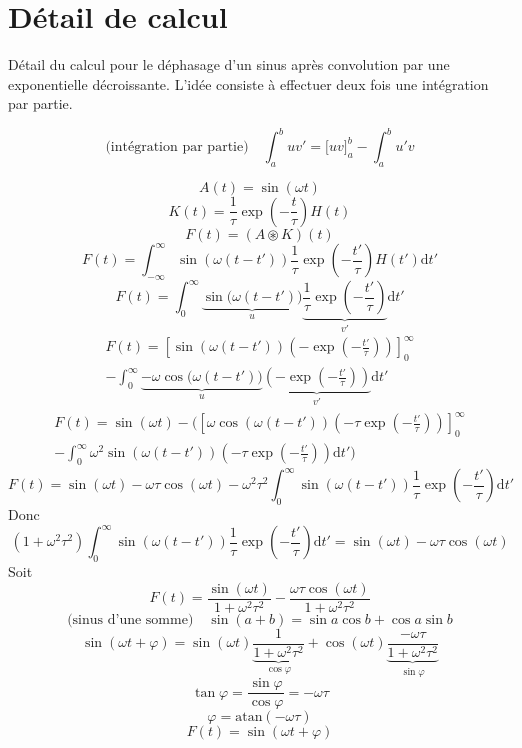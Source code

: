 




\chapter{Détail de calcul}\label{calculdetail}

Détail du calcul pour le déphasage d'un sinus après convolution par une exponentielle décroissante. L'idée consiste à effectuer deux fois une intégration par partie.

$$
\text{(intégration par partie)} \quad \int_a^buv' = \Big[uv\Big]_a^b - \int_a^b u'v
$$

$$ A(t) = \sin(\omega t) $$
$$ K(t) = \frac{1}{\tau}\exp\left(-\frac{t}{\tau}\right)H(t) $$
$$ F(t) = (A\circledast K)(t) $$ 
$$
F(t) = \int_{-\infty}^\infty\sin(\omega(t-t'))\frac{1}{\tau}\exp\left(-\frac{t'}{\tau}\right)H(t')\mathrm{d}t'
$$
$$
F(t) = \int_{0}^\infty\underbrace{\sin\bigg(\omega(t-t')\bigg)}_u\underbrace{\frac{1}{\tau}\exp\left(-\frac{t'}{\tau}\right)}_{v'}\mathrm{d}t'
$$
\begin{multline}
F(t) = \left[\sin(\omega(t-t'))\left(-\exp\left(-\frac{t'}{\tau}\right)\right)\right]_0^\infty \\ -
\int_{0}^\infty\underbrace{-\omega\cos\bigg(\omega(t-t')\bigg)}_u\underbrace{\left(-\exp\left(-\frac{t'}{\tau}\right)\right)}_{v'}\mathrm{d}t'
\end{multline}
\begin{multline}
F(t) = \sin(\omega t) -
\Bigg(\left[\omega\cos(\omega(t-t'))\left(-\tau\exp\left(-\frac{t'}{\tau}\right)\right)\right]_0^\infty \\ -
\int_0^\infty\omega^2\sin(\omega(t-t'))\left(-\tau\exp\left(-\frac{t'}{\tau}\right)\right)\mathrm{d}t' \Bigg)
\end{multline}
$$
F(t) = \sin(\omega t) - \omega\tau\cos(\omega t) - \omega^2\tau^2\int_0^\infty\sin(\omega(t-t')) \frac{1}{\tau}\exp\left(-\frac{t'}{\tau}\right)\mathrm{d}t'
$$
Donc
$$
(1+\omega^2\tau^2)\int_0^\infty\sin(\omega(t-t')) \frac{1}{\tau}\exp\left(-\frac{t'}{\tau}\right)\mathrm{d}t' = \sin(\omega t) - \omega\tau\cos(\omega t)
$$
Soit
$$
F(t) = \frac{\sin(\omega t)}{1+\omega^2\tau^2} - \frac{\omega\tau\cos(\omega t)}{1+\omega^2\tau^2}
$$
$$ \text{(sinus d'une somme)}  \quad  \sin(a+b) = \sin a\cos b + \cos a\sin b $$
$$
\sin(\omega t+\varphi) = \sin(\omega t)\underbrace{\frac{1}{1+\omega^2\tau^2}}_{\cos\varphi} + \cos(\omega t)\underbrace{\frac{-\omega\tau}{1+\omega^2\tau^2}}_{\sin\varphi}
$$
$$ \tan\varphi = \frac{\sin\varphi}{\cos\varphi} = -\omega\tau $$
$$ \varphi = \mathrm{atan}(-\omega\tau) $$
$$ F(t) = \sin(\omega t + \varphi) $$

